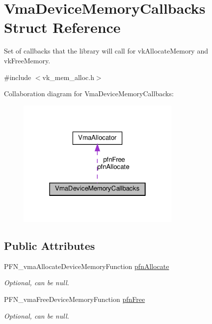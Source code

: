 \hypertarget{structVmaDeviceMemoryCallbacks}{}\section{Vma\+Device\+Memory\+Callbacks Struct Reference}
\label{structVmaDeviceMemoryCallbacks}


Set of callbacks that the library will call for {\ttfamily vk\+Allocate\+Memory} and {\ttfamily vk\+Free\+Memory}.  




{\ttfamily \#include $<$vk\+\_\+mem\+\_\+alloc.\+h$>$}



Collaboration diagram for Vma\+Device\+Memory\+Callbacks\+:\nopagebreak
\begin{figure}[H]
\begin{center}
\leavevmode
\includegraphics[width=226pt]{structVmaDeviceMemoryCallbacks__coll__graph}
\end{center}
\end{figure}
\subsection*{Public Attributes}
\begin{DoxyCompactItemize}
\item 
\mbox{\label{structVmaDeviceMemoryCallbacks_a4f17f7b255101e733b44d5633aceabfb}} 
P\+F\+N\+\_\+vma\+Allocate\+Device\+Memory\+Function \hyperlink{structVmaDeviceMemoryCallbacks_a4f17f7b255101e733b44d5633aceabfb}{pfn\+Allocate}
\begin{DoxyCompactList}\small\item\em Optional, can be null. \end{DoxyCompactList}\item 
\mbox{\label{structVmaDeviceMemoryCallbacks_abe8a3328bbc916f6f712fdb6b299444c}} 
P\+F\+N\+\_\+vma\+Free\+Device\+Memory\+Function \hyperlink{structVmaDeviceMemoryCallbacks_abe8a3328bbc916f6f712fdb6b299444c}{pfn\+Free}
\begin{DoxyCompactList}\small\item\em Optional, can be null. \end{DoxyCompactList}\end{DoxyCompactItemize}


